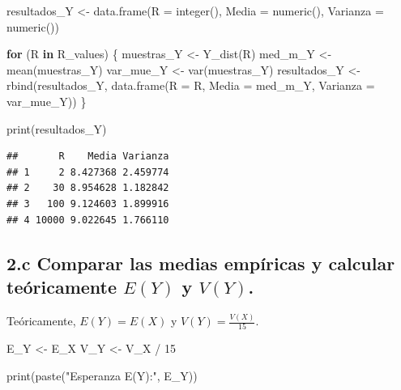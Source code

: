 \documentclass[
]{article}
\newenvironment{Shaded}{}{}
\newcommand{\AttributeTok}[1]{\textcolor[rgb]{0.49,0.56,0.16}{#1}}
\newcommand{\ControlFlowTok}[1]{\textcolor[rgb]{0.00,0.44,0.13}{\textbf{#1}}}
\newcommand{\DecValTok}[1]{\textcolor[rgb]{0.25,0.63,0.44}{#1}}
\newcommand{\FunctionTok}[1]{\textcolor[rgb]{0.02,0.16,0.49}{#1}}
\newcommand{\NormalTok}[1]{#1}
\newcommand{\OtherTok}[1]{\textcolor[rgb]{0.00,0.44,0.13}{#1}}
\newcommand{\SpecialCharTok}[1]{\textcolor[rgb]{0.25,0.44,0.63}{#1}}
\newcommand{\StringTok}[1]{\textcolor[rgb]{0.25,0.44,0.63}{#1}}
\begin{document}
\begin{Shaded}
\begin{Highlighting}[]
\NormalTok{resultados\_Y }\OtherTok{\textless{}{-}} \FunctionTok{data.frame}\NormalTok{(}\AttributeTok{R =} \FunctionTok{integer}\NormalTok{(), }\AttributeTok{Media =} \FunctionTok{numeric}\NormalTok{(), }\AttributeTok{Varianza =} \FunctionTok{numeric}\NormalTok{())}

\ControlFlowTok{for}\NormalTok{ (R }\ControlFlowTok{in}\NormalTok{ R\_values) \{}
\NormalTok{  muestras\_Y }\OtherTok{\textless{}{-}} \FunctionTok{Y\_dist}\NormalTok{(R)}
\NormalTok{  med\_m\_Y }\OtherTok{\textless{}{-}} \FunctionTok{mean}\NormalTok{(muestras\_Y)}
\NormalTok{  var\_mue\_Y }\OtherTok{\textless{}{-}} \FunctionTok{var}\NormalTok{(muestras\_Y)}
\NormalTok{  resultados\_Y }\OtherTok{\textless{}{-}} \FunctionTok{rbind}\NormalTok{(resultados\_Y, }\FunctionTok{data.frame}\NormalTok{(}\AttributeTok{R =}\NormalTok{ R, }\AttributeTok{Media =}\NormalTok{ med\_m\_Y, }\AttributeTok{Varianza =}\NormalTok{ var\_mue\_Y))}
\NormalTok{\}}

\FunctionTok{print}\NormalTok{(resultados\_Y)}
\end{Highlighting}
\end{Shaded}

\begin{verbatim}
##       R    Media Varianza
## 1     2 8.427368 2.459774
## 2    30 8.954628 1.182842
## 3   100 9.124603 1.899916
## 4 10000 9.022645 1.766110
\end{verbatim}

\subsection{\texorpdfstring{2.c Comparar las medias empíricas y calcular
teóricamente \(E(Y)\) y
\(V(Y)\).}{2.c Comparar las medias empíricas y calcular teóricamente E(Y) y V(Y).}}\label{c-comparar-las-medias-empuxedricas-y-calcular-teuxf3ricamente-ey-y-vy.}

Teóricamente, \(E(Y) = E(X)\) y \(V(Y) = \frac{V(X)}{15}\).

\begin{Shaded}
\begin{Highlighting}[]
\NormalTok{E\_Y }\OtherTok{\textless{}{-}}\NormalTok{ E\_X  }
\NormalTok{V\_Y }\OtherTok{\textless{}{-}}\NormalTok{ V\_X }\SpecialCharTok{/} \DecValTok{15}  

\FunctionTok{print}\NormalTok{(}\FunctionTok{paste}\NormalTok{(}\StringTok{"Esperanza E(Y):"}\NormalTok{, E\_Y))}
\end{Highlighting}
\end{Shaded}
\end{document}
